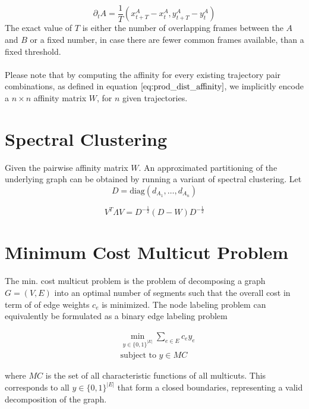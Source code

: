 \begin{equation}
	\partial_t A = \frac{1}{T} \left( x_{t+T}^{A} - x_{t}^{A}, y_{t+T}^{A} - y_{t}^{A}\right)
\end{equation}
The exact value of $T$ is either the number of overlapping frames between the $A$ and $B$ or a fixed number, in case there are fewer common frames available, than a fixed threshold. \\ \\
Please note that by computing the affinity for every existing trajectory pair combinations, as defined in equation $\ref{eq:prod_dist_affinity}$, we implicitly encode a $n \times n$ affinity matrix $W$, for $n$ given trajectories. 

\section{Spectral Clustering}

Given the pairwise affinity matrix $W$. An approximated partitioning of the underlying graph can be obtained by running a variant of spectral clustering. Let
\begin{equation}
	D = \text{diag} \left( d_{A_1}, \dots, d_{A_n} \right)
\end{equation}

\begin{equation}
	V^{T} \Lambda V = D^{-\frac{1}{2}} \left( D - W \right) D^{-\frac{1}{2}}
\end{equation}

\section{Minimum Cost Multicut Problem}
The min. cost multicut problem is the problem of decomposing a graph $G = (V, E)$ into an optimal number of segments such that the overall cost in term of of edge weights $c_e$ is minimized. The node labeling problem can equivalently be formulated as a binary edge labeling problem

\begin{equation}
\begin{aligned}
& \min_{y \in \{0,1 \}^{|E|}} \sum_{e \in E} c_e y_e \\
& \text{subject to } y \in MC
\end{aligned}
\end{equation}

where $MC$ is the set of all characteristic functions of all multicuts. This corresponds to all $y \in \{0,1 \}^{|E|}$ that form a closed boundaries, representing a valid decomposition of the graph.

